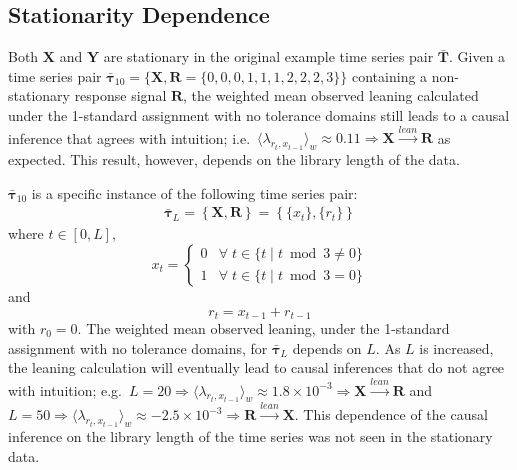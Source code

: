 \documentclass[a4paper,11pt,twocolumn]{article}
\begin{document}
\subsection{Stationarity Dependence}
Both $\mathbf{X}$ and $\mathbf{Y}$ are stationary in the original example time series pair $\bar{\mathbf{T}}$.  Given a time series pair $\bar{\mathbf{\tau}}_{10} = \{\mathbf{X},\mathbf{R} = \{0,0,0,1,1,1,2,2,2,3\}\}$ containing a non-stationary response signal $\mathbf{R}$, the weighted mean observed leaning calculated under the 1-standard assignment with no tolerance domains still leads to a causal inference that agrees with intuition; i.e.\ $\langle \lambda_{r_t,x_{t-1}} \rangle_w \approx 0.11 \Rightarrow \mathbf{X}\xrightarrow{lean}\mathbf{R}$ as expected.  This result, however, depends on the library length of the data.

$\bar{\mathbf{\tau}}_{10}$ is a specific instance of the following time series pair:
\begin{eqnarray}
\bar{\mathbf{\tau}}_L = \left\{\mathbf{X},\mathbf{R}\right\} = \left\{\{x_t\},\{r_t\}\right\}
\end{eqnarray}
where $t\in[0,L]$,
\begin{equation}
x_t = \left\{
  \begin{array}{lr}
    0 & \forall\; t\in\{t\;|\;t\bmod 3 \neq 0\}\\
    1 & \forall\; t\in\{t\;|\;t\bmod 3 = 0\}
  \end{array}
\right.
\end{equation}
and
\begin{equation}
r_t = x_{t-1}+r_{t-1}
\end{equation}
with $r_0 = 0$.  The weighted mean observed leaning, under the 1-standard assignment with no tolerance domains, for $\bar{\mathbf{\tau}}_L$ depends on $L$.  As $L$ is increased, the leaning calculation will eventually lead to causal inferences that do not agree with intuition; e.g.\ $L = 20 \Rightarrow \langle \lambda_{r_t,x_{t-1}} \rangle_w \approx 1.8\times10^{-3} \Rightarrow \mathbf{X}\xrightarrow{lean}\mathbf{R}$ and $L = 50 \Rightarrow \langle \lambda_{r_t,x_{t-1}} \rangle_w \approx -2.5\times10^{-3} \Rightarrow \mathbf{R}\xrightarrow{lean}\mathbf{X}$.  This dependence of the causal inference on the library length of the time series was not seen in the stationary data.
\end{document}
